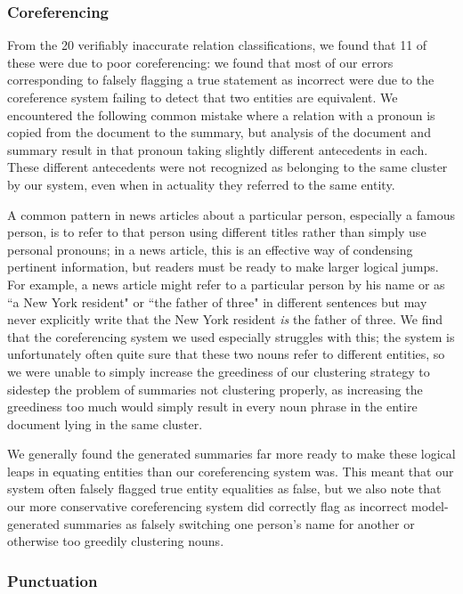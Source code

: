\documentclass{article}
\begin{document}
\subsubsection{Coreferencing}

From the 20 verifiably inaccurate relation classifications, we found that 11 of these were due to poor coreferencing: we found that most of our errors corresponding to falsely flagging a true statement as incorrect were due to the coreference system failing to detect that two entities are equivalent. We encountered the following common mistake where a relation with a pronoun is copied from the document to the summary, but analysis of the document and summary result in that pronoun taking slightly different antecedents in each. These different antecedents were not recognized as belonging to the same cluster by our system, even when in actuality they referred to the same entity.

A common pattern in news articles about a particular person, especially a famous person, is to refer to that person using different titles rather than simply use personal pronouns; in a news article, this is an effective way of condensing pertinent information, but readers must be ready to make larger logical jumps. For example, a news article might refer to a particular person by his name or as ``a New York resident" or ``the father of three" in different sentences but may never explicitly write that the New York resident \textit{is} the father of three. We find that the coreferencing system we used especially struggles with this;  the system is unfortunately often quite sure that these two nouns refer to different entities, so we were unable to simply increase the greediness of our clustering strategy to sidestep the problem of summaries not clustering properly, as increasing the greediness too much would simply result in every noun phrase in the entire document lying in the same cluster.

We generally found the generated summaries far more ready to make these logical leaps in equating entities than our coreferencing system was. This meant that our system often falsely flagged true entity equalities as false, but we also note that our more conservative coreferencing system did correctly flag as incorrect model-generated summaries as falsely switching one person's name for another or otherwise too greedily clustering nouns.

\subsubsection{Punctuation}
\end{document}
